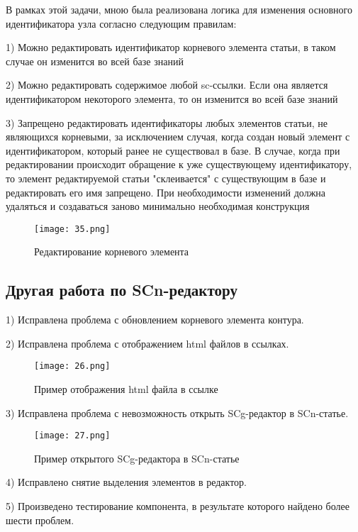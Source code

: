 В рамках этой задачи, мною была реализована логика для изменения основного идентификатора узла согласно следующим правилам:

1) Можно редактировать идентификатор корневого элемента статьи, в таком случае он изменится во всей базе знаний

2) Можно редактировать содержимое любой sc-ссылки. Если она является идентификатором некоторого элемента, то он изменится во всей базе знаний

3) Запрещено редактировать идентификаторы любых элементов статьи, не являющихся корневыми, за исключением случая, когда создан новый элемент с идентификатором, который ранее не существовал в базе. В случае, когда при редактировании происходит обращение к уже существующему идентификатору, то элемент редактируемой статьи "склеивается" с существующим в базе и редактировать его имя запрещено. При необходимости изменений должна удаляться и создаваться заново минимально необходимая конструкция

\begin{figure}[H]
  \centering
  \texttt{[image: 35.png]}
  \caption{Редактирование корневого элемента}
  \label{fig:hardware:sdr_pipeline}
\end{figure}

\newpage
\subsection{Другая работа по SCn-редактору}
1) Исправлена проблема с обновлением корневого элемента контура.

2) Исправлена проблема с отображением html файлов в ссылках.

\begin{figure}[H]
  \centering
  \texttt{[image: 26.png]}
  \caption{Пример отображения html файла в ссылке}
  \label{fig:hardware:sdr_pipeline}
\end{figure}

3) Исправлена проблема с невозможность открыть SCg-редактор в SCn-статье. 

\begin{figure}[H]
  \centering
  \texttt{[image: 27.png]}
  \caption{Пример открытого SCg-редактора в SCn-статье}
  \label{fig:hardware:sdr_pipeline}
\end{figure}

4) Исправлено снятие выделения элементов в редактор. 

5) Произведено тестирование компонента, в результате которого найдено более шести проблем.


